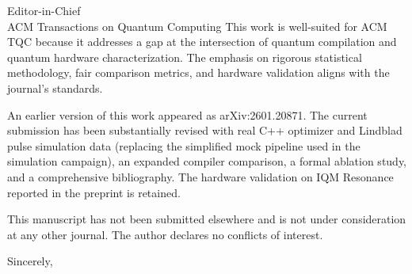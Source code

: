 \documentclass[11pt]{letter}
\begin{document}
\begin{letter}{Editor-in-Chief\\
ACM Transactions on Quantum Computing}
This work is well-suited for ACM TQC because it addresses a gap at the intersection of quantum compilation and quantum hardware characterization. The emphasis on rigorous statistical methodology, fair comparison metrics, and hardware validation aligns with the journal's standards.

An earlier version of this work appeared as arXiv:2601.20871. The current submission has been substantially revised with real C++ optimizer and Lindblad pulse simulation data (replacing the simplified mock pipeline used in the simulation campaign), an expanded compiler comparison, a formal ablation study, and a comprehensive bibliography. The hardware validation on IQM Resonance reported in the preprint is retained.

This manuscript has not been submitted elsewhere and is not under consideration at any other journal. The author declares no conflicts of interest.

\closing{Sincerely,}

\end{letter}
\end{document}
